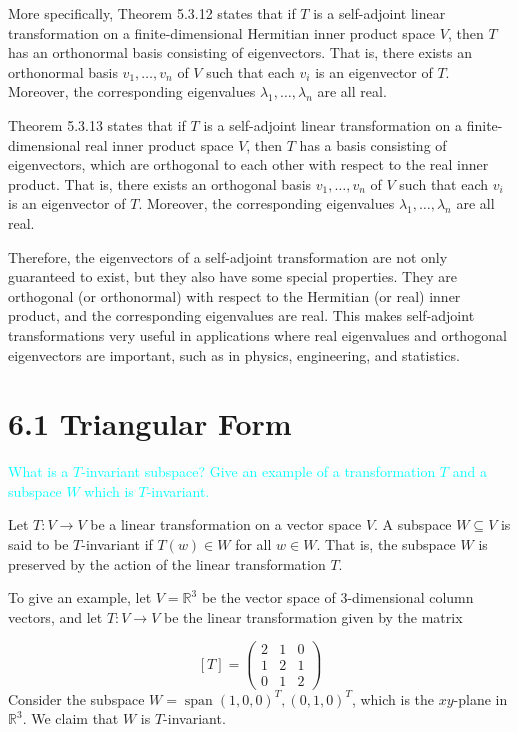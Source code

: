 \documentclass[fontsize=12pt]{scrartcl}
\begin{document}
\noindent
More specifically, Theorem 5.3.12 states that if $T$ is a self-adjoint linear transformation on a finite-dimensional Hermitian inner product space $V$, then $T$ has an orthonormal basis consisting of eigenvectors. That is, there exists an orthonormal basis ${v_1, \ldots, v_n}$ of $V$ such that each $v_i$ is an eigenvector of $T$. Moreover, the corresponding eigenvalues $\lambda_1, \ldots, \lambda_n$ are all real.

\noindent
Theorem 5.3.13 states that if $T$ is a self-adjoint linear transformation on a finite-dimensional real inner product space $V$, then $T$ has a basis consisting of eigenvectors, which are orthogonal to each other with respect to the real inner product. That is, there exists an orthogonal basis ${v_1, \ldots, v_n}$ of $V$ such that each $v_i$ is an eigenvector of $T$. Moreover, the corresponding eigenvalues $\lambda_1, \ldots, \lambda_n$ are all real.

\noindent
Therefore, the eigenvectors of a self-adjoint transformation are not only guaranteed to exist, but they also have some special properties. They are orthogonal (or orthonormal) with respect to the Hermitian (or real) inner product, and the corresponding eigenvalues are real. This makes self-adjoint transformations very useful in applications where real eigenvalues and orthogonal eigenvectors are important, such as in physics, engineering, and statistics.


\newpage

\section{6.1 Triangular Form}

\bigskip

\noindent
\textcolor{cyan}{What is a $T$-invariant subspace? Give an example of a transformation $T$ and a subspace $W$ which is $T$-invariant.}

\noindent
Let $T:V\to V$ be a linear transformation on a vector space $V$. A subspace $W\subseteq V$ is said to be $T$-invariant if $T(w) \in W$ for all $w \in W$. That is, the subspace $W$ is preserved by the action of the linear transformation $T$.

\noindent
To give an example, let $V = \mathbb{R}^3$ be the vector space of $3$-dimensional column vectors, and let $T:V\to V$ be the linear transformation given by the matrix

$$[T] = \left( \begin{array}{ccc} 2 & 1& 0 \\ 1 & 2 & 1 \\ 0 & 1 & 2 \end{array} \right )$$
\noindent
Consider the subspace $W = \operatorname{span}{(1,0,0)^T, (0,1,0)^T}$, which is the $xy$-plane in $\mathbb{R}^3$. We claim that $W$ is $T$-invariant.
\end{document}
